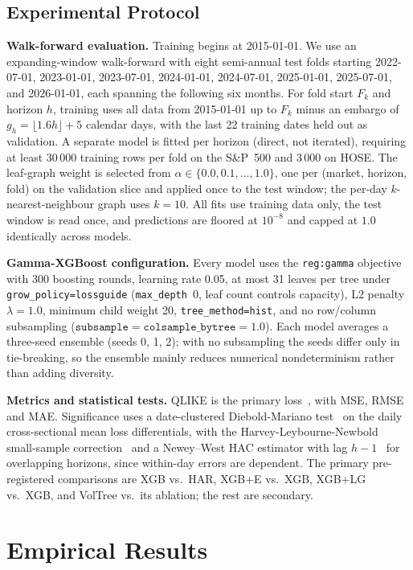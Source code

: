\documentclass[runningheads]{llncs}
\begin{document}
\subsection{Experimental Protocol}
\textbf{Walk-forward evaluation.} Training begins at 2015-01-01. We use an expanding-window walk-forward
with eight semi-annual test folds starting 2022-07-01, 2023-01-01, 2023-07-01, 2024-01-01, 2024-07-01,
2025-01-01, 2025-07-01, and 2026-01-01, each spanning the following six months. For fold start $F_k$ and
horizon $h$, training uses all data from 2015-01-01 up to $F_k$ minus an embargo of
$g_h=\lfloor 1.6h\rfloor+5$ calendar days, with the last 22 training dates held out as validation. A
separate model is fitted per horizon (direct, not iterated), requiring at least 30\,000 training rows per
fold on the S\&P~500 and 3\,000 on HOSE. The leaf-graph weight is selected from
$\alpha\in\{0.0,0.1,\dots,1.0\}$, one per (market, horizon, fold) on the validation slice and applied once
to the test window; the per-day $k$-nearest-neighbour graph uses $k=10$. All fits use training data only,
the test window is read once, and predictions are floored at $10^{-8}$ and capped at $1.0$ identically
across models.

\textbf{Gamma-XGBoost configuration.} Every model uses the \texttt{reg:gamma} objective with 300 boosting
rounds, learning rate 0.05, at most 31 leaves per tree under \texttt{grow\_policy=lossguide}
(\texttt{max\_depth}~0, leaf count controls capacity), L2 penalty $\lambda=1.0$, minimum child weight 20,
\texttt{tree\_method=hist}, and no row/column subsampling
($\texttt{subsample}=\texttt{colsample\_bytree}=1.0$). Each model averages a three-seed ensemble (seeds 0,
1, 2); with no subsampling the seeds differ only in tie-breaking, so the ensemble mainly reduces numerical
nondeterminism rather than adding diversity.

\textbf{Metrics and statistical tests.} QLIKE is the primary loss~\cite{patton2011}, with MSE, RMSE and
MAE. Significance uses a date-clustered Diebold-Mariano test~\cite{dm1995} on the daily cross-sectional
mean loss differentials, with the Harvey-Leybourne-Newbold small-sample correction~\cite{hln1997} and a
Newey--West HAC estimator with lag $h-1$~\cite{neweywest1987} for overlapping horizons, since within-day
errors are dependent. The primary pre-registered comparisons are XGB vs.\ HAR, XGB+E vs.\ XGB, XGB+LG
vs.\ XGB, and VolTree vs.\ its ablation; the rest are secondary.

\FloatBarrier

\section{Empirical Results}
\end{document}

